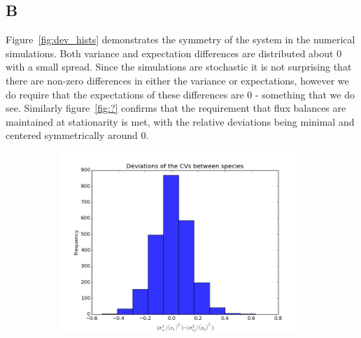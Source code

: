 \documentclass[a4paper,12pt]{article}
\begin{document}
\subsection*{B}
Figure~\ref{fig:dev_hists} demonstrates the symmetry of the system in the numerical simulations. Both variance and expectation differences are distributed about 0 with a small spread. Since the simulations are stochastic it is not surprising that there are non-zero differences in either the variance or expectations, however we do require that the expectations of these differences are 0  - something that we do see. Similarly figure~\ref{fig:?} confirms that the requirement that flux balances are maintained at stationarity is met, with the relative deviations being minimal and centered symmetrically around 0.


\begin{figure}[!ht]
        \centering
        \begin{subfigure}[!ht]{0.7\textwidth}
                \includegraphics[width=\textwidth]{images/vars_devs}
                \caption{}
                \label{fig:devs_vars}
        \end{subfigure}%
        

\end{figure}
\end{document}
